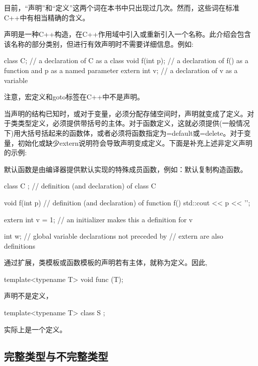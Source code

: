 
目前，“声明”和“定义”这两个词在本书中只出现过几次。然而，这些词在标准C++中有相当精确的含义。

声明是一种C++构造，在C++作用域中引入或重新引入一个名称。此介绍会包含该名称的部分类别，但进行有效声明时不需要详细信息。例如:

\begin{cpp}
class C; // a declaration of C as a class
void f(int p); // a declaration of f() as a function and p as a named parameter
extern int v; // a declaration of v as a variable
\end{cpp}

注意，宏定义和goto标签在C++中不是声明。

当声明的结构已知时，或对于变量，必须分配存储空间时，声明就变成了定义。对于类类型定义，必须提供带括号的主体。对于函数定义，这就必须提供(一般情况下)用大括号括起来的函数体，或者必须将函数指定为=default或=delete。对于变量，初始化或缺少extern说明符会导致声明变成定义。下面是补充上述非定义声明的示例:

\begin{notice}默认函数是由编译器提供默认实现的特殊成员函数，例如：默认复制构造函数。
\end{notice}

\begin{cpp}
class C {}; // definition (and declaration) of class C

void f(int p) { // definition (and declaration) of function f()
	std::cout << p << ’\n’;
}

extern int v = 1; // an initializer makes this a definition for v

int w; // global variable declarations not preceded by
// extern are also definitions
\end{cpp}

通过扩展，类模板或函数模板的声明若有主体，就称为定义。因此,

\begin{cpp}
template<typename T>
void func (T);
\end{cpp}

声明不是定义，

\begin{cpp}
template<typename T>
class S {};
\end{cpp}

实际上是一个定义。

\subsection{完整类型与不完整类型}

